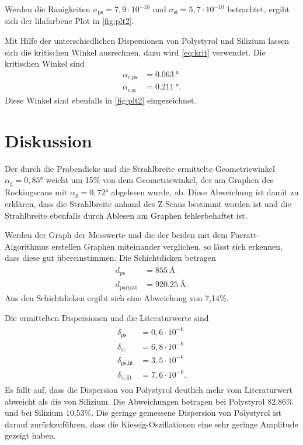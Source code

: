 Werden die Rauigkeiten $\sigma_\text{ps} = 7,9\cdot 10^{-10}$ und $\sigma_\text{si} = 5,7\cdot 10^{-10}$
betrachtet, ergibt sich der lilafarbene Plot in \autoref{fig:plt2}.

Mit Hilfe der unterschiedlichen Dispersionen von Polystyrol und Silizium lassen sich die kritischen Winkel ausrechnen,
dazu wird \autoref{eq:krit} verwendet.
Die kritischen Winkel sind
\begin{align*}
    \alpha_\text{c,ps}& = \SI{0,063}{\degree}\\
    \alpha_\text{c,si}& = \SI{0.211}{\degree}.
\end{align*}
Diese Winkel sind ebenfalls in \autoref{fig:plt2} eingezeichnet.

\newpage
\section{Diskussion}
Der durch die Probendicke und die Strahlbreite ermittelte Geometriewinkel $\alpha_\text{g} =0,85°$ weicht um 15\%
von dem Geometriewinkel, der am Graphen des Rockingscans mit $\alpha_\text{g} =0,72°$ abgelesen wurde, ab. 
Diese Abweichung ist damit zu erklären, dass die Strahlbreite anhand des Z-Scans bestimmt worden ist und die Strahlbreite
ebenfalls durch Ablesen am Graphen fehlerbehaftet ist.

Werden der Graph der Messwerte und die der beiden mit dem Parratt-Algorithmus erstellen Graphen miteinander verglichen, so lässt sich 
erkennen, dass diese gut übereinstimmen.
Die Schichtdicken betragen
\begin{align*}
    d_\text{ps} &= \SI{855}{\angstrom}\\
    d_\text{parratt} &= \SI{920,25}{\angstrom}.
\end{align*}
Aus den Schichtdicken ergibt sich eine Abweichung von 7,14\%.

Die ermittelten Dispersionen und die Literaturwerte\cite{V44old} sind
\begin{align}
    \begin{split}    
        \delta_\text{ps} &= 0,6\cdot 10^{-6}\\
        \delta_\text{si}&= 6,8\cdot 10^{-6} \\
        \delta_\text{ps,lit} &= 3,5\cdot 10^{-6}\\
        \delta_\text{si,lit}&= 7,6\cdot 10^{-6}.
    \end{split} 
\end{align}
Es fällt auf, dass die Dispersion von Polystyrol deutlich mehr vom Literaturwert abweicht als die von Silizium.
Die Abweichungen betragen bei Polystyrol 82,86\% und bei Silizium 10,53\%.
Die geringe gemessene Dispersion von Polystyrol ist darauf zurückzuführen, dass die Kiessig-Oszillationen eine
sehr geringe Amplitude gezeigt haben.

